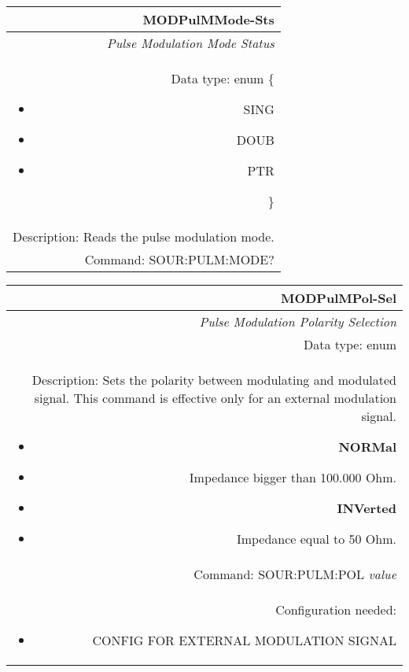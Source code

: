 \documentclass[openany]{article}
\begin{document}
		\begin{tabular}{N}
			\hline
			\bfseries MODPulMMode-Sts \\ \hline
			\emph{Pulse Modulation Mode Status} \\
			Data type: enum \{\begin{itemize}[noitemsep]
				\small
				\item[] SING
				\item[] DOUB
				\item[] PTR
			\end{itemize}\} \\ 
			Description: Reads the pulse modulation mode. \\
			Command: SOUR:PULM:MODE? \\

		\end{tabular}
%
		\begin{tabular}{N}
			\hline
			\bfseries MODPulMPol-Sel \\ \hline
			\emph{Pulse Modulation Polarity Selection} \\
			Data type: enum \\  
			Description: Sets the polarity between modulating and modulated signal. This command is effective only for an external modulation signal.\begin{itemize}[noitemsep]
				\small
				\item[] \textbf{NORMal}
                                \item[] Impedance bigger than 100.000 Ohm.
                                \item[] \textbf{INVerted}
                                \item[] Impedance equal to 50 Ohm.
			\end{itemize} \\
			Command: SOUR:PULM:POL \emph{value} \\
			Configuration needed:\begin{itemize}[noitemsep]
				\small
				\item[] CONFIG FOR EXTERNAL MODULATION SIGNAL
			\end{itemize}

		\end{tabular}
\end{document}
